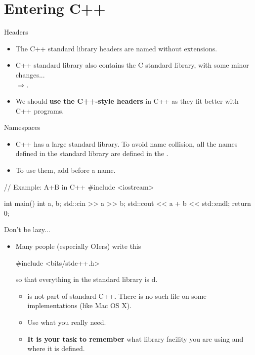 \documentclass{beamer}
\begin{document}
\section{Entering C++}

\begin{frame}{Headers}
    \begin{itemize}
        \item The C++ standard library headers are named without extensions.
        \item C++ standard library also contains the C standard library, with some minor changes...\\
        \quad\(\Longrightarrow\)\quad{}.
        \item We should \textbf{use the C++-style headers} in C++ as they fit better with C++ programs.
    \end{itemize}
\end{frame}

\begin{frame}[fragile]{Namespaces}
    \begin{itemize}
        \item C++ has a large standard library. To avoid name collision, all the names defined in the standard library are defined in the .
        \item To use them, add before a name.
    \end{itemize}
    \pause
    \begin{cpp}
// Example: A+B in C++
#include <iostream>

int main() {
  int a, b;
  std::cin >> a >> b;
  std::cout << a + b << std::endl;
  return 0;
}
    \end{cpp}
\end{frame}

\begin{frame}[fragile]{Don't be lazy...}
    \begin{itemize}
        \item Many people (especially OIers) write this
        \begin{cpp}
#include <bits/stdc++.h>
        \end{cpp}
        so that everything in the standard library is d.
        \pause
        \begin{itemize}
            \item {} is not part of standard C++. There is no such file on some implementations (like Mac OS X).
            \item Use what you really need.
            \item \textbf{It is your task to remember} what library facility you are using and where it is defined.
        \end{itemize}
    \end{itemize}
\end{frame}
\end{document}
